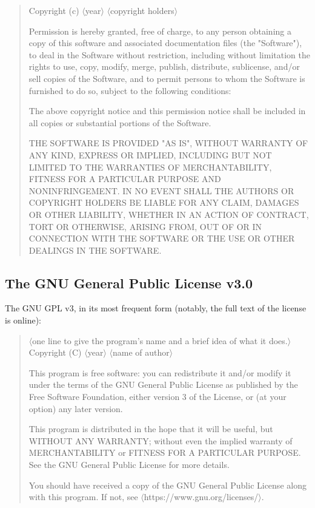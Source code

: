 \documentclass[12pt,a4paper]{article}
\begin{document}
\begin{quote}
Copyright (c) $\langle$year$\rangle$ $\langle$copyright holders$\rangle$

Permission is hereby granted, free of charge, to any person obtaining a copy
of this software and associated documentation files (the "Software"), to deal
in the Software without restriction, including without limitation the rights
to use, copy, modify, merge, publish, distribute, sublicense, and/or sell
copies of the Software, and to permit persons to whom the Software is
furnished to do so, subject to the following conditions:

The above copyright notice and this permission notice shall be included in all
copies or substantial portions of the Software.

THE SOFTWARE IS PROVIDED "AS IS", WITHOUT WARRANTY OF ANY KIND, EXPRESS OR
IMPLIED, INCLUDING BUT NOT LIMITED TO THE WARRANTIES OF MERCHANTABILITY,
FITNESS FOR A PARTICULAR PURPOSE AND NONINFRINGEMENT. IN NO EVENT SHALL THE
AUTHORS OR COPYRIGHT HOLDERS BE LIABLE FOR ANY CLAIM, DAMAGES OR OTHER
LIABILITY, WHETHER IN AN ACTION OF CONTRACT, TORT OR OTHERWISE, ARISING FROM,
OUT OF OR IN CONNECTION WITH THE SOFTWARE OR THE USE OR OTHER DEALINGS IN THE
SOFTWARE. \cite{mit-license}
\end{quote}

\subsection{The GNU General Public License v3.0}
The GNU GPL v3, in its most frequent form (notably, the full text of the license is online):

\begin{quote}
$\langle$one line to give the program's name and a brief idea of what it does.$\rangle$
Copyright (C) $\langle$year$\rangle$  $\langle$name of author$\rangle$

This program is free software: you can redistribute it and/or modify
it under the terms of the GNU General Public License as published by
the Free Software Foundation, either version 3 of the License, or
(at your option) any later version.

This program is distributed in the hope that it will be useful,
but WITHOUT ANY WARRANTY; without even the implied warranty of
MERCHANTABILITY or FITNESS FOR A PARTICULAR PURPOSE.  See the
GNU General Public License for more details.

You should have received a copy of the GNU General Public License
along with this program.  If not, see $\langle$https://www.gnu.org/licenses/$\rangle$. \cite{gplv3}
\end{quote}





\end{document}
